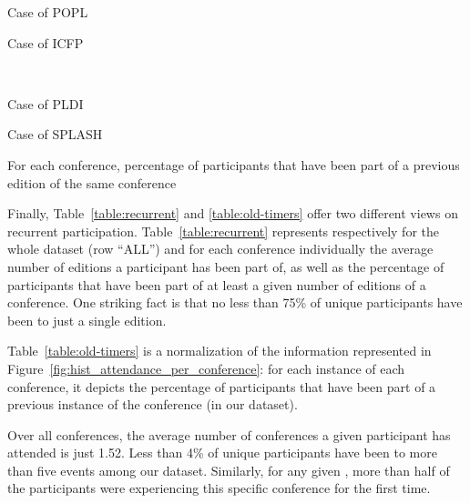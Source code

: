 \begin{table}
  \centering
  \begin{subtable}[b]{0.4\textwidth}
    \centering
    \caption{Case of POPL}
  \end{subtable}
  \begin{subtable}[b]{0.4\textwidth}
    \centering
    \caption{Case of ICFP}
  \end{subtable}
  \\
  \begin{subtable}[b]{0.4\textwidth}
    \centering
    \caption{Case of PLDI}
  \end{subtable}
  \begin{subtable}[b]{0.4\textwidth}
    \centering
    \caption{Case of SPLASH}
  \end{subtable}
  \caption{For each conference, percentage of participants that have been
    part of a previous edition of the same conference}
  \label{table:old-timers}
\end{table}

Finally, Table~\ref{table:recurrent} and \ref{table:old-timers} offer two
different views on recurrent participation. Table~\ref{table:recurrent}
represents respectively for the whole dataset (row ``ALL'') and for each
conference individually the average number of editions a participant has
been part of, as well as the percentage of participants that have been part
of at least a given number of editions of a conference. One striking fact is
that no less than 75\% of unique participants have been to just a single
edition.

Table~\ref{table:old-timers} is a normalization of the information represented
in Figure~\ref{fig:hist_attendance_per_conference}: for each instance of each
conference, it depicts the percentage of participants that have been part of a
previous instance of the conference (in our dataset).

\begin{obs}
Over all conferences, the average number of conferences a given participant
has attended is just 1.52. Less than 4\% of unique participants have been to
more than five events among our dataset.  Similarly, for any given \event,
more than half of the participants were experiencing this specific
conference for the first time.
  \label{obs:old-timers}
\end{obs}


